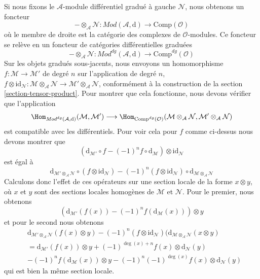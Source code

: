 \medskip\noindent
Si nous fixons le $\mathcal{A}$-module différentiel gradué à gauche $\mathcal{N}$, nous obtenons un foncteur
$$
- \otimes_\mathcal{A} \mathcal{N} :
\textit{Mod}(\mathcal{A}, \text{d})
\longrightarrow
\text{Comp}(\mathcal{O})
$$
où le membre de droite est la catégorie des complexes de $\mathcal{O}$-modules.
Ce foncteur se relève en un foncteur de catégories différentielles graduées
$$
- \otimes_\mathcal{A} \mathcal{N} :
\textit{Mod}^{dg}(\mathcal{A}, \text{d})
\longrightarrow
\text{Comp}^{dg}(\mathcal{O})
$$
Sur les objets gradués sous-jacents, nous envoyons un homomorphisme $f : \mathcal{M} \to \mathcal{M}'$ de degré $n$ sur l'application de degré $n$, $f \otimes \text{id}_\mathcal{N} : \mathcal{M} \otimes_\mathcal{A} \mathcal{N} \to \mathcal{M}' \otimes_\mathcal{A} \mathcal{N}$, conformément à la construction de la section \ref{section-tensor-product}.
Pour montrer que cela fonctionne, nous devons vérifier que l'application
$$
\Hom_{\textit{Mod}^{dg}(\mathcal{A}, \text{d})}(\mathcal{M}, \mathcal{M}')
\longrightarrow
\Hom_{\text{Comp}^{dg}(\mathcal{O})}(
\mathcal{M} \otimes_\mathcal{A} \mathcal{N},
\mathcal{M}' \otimes_\mathcal{A} \mathcal{N})
$$
est compatible avec les différentiels.
Pour voir cela pour $f$ comme ci-dessus nous devons montrer que
$$
(\text{d}_{\mathcal{M}'} \circ f - (-1)^n f \circ \text{d}_\mathcal{M})
\otimes \text{id}_\mathcal{N}
$$
est égal à
$$
\text{d}_{\mathcal{M}' \otimes_\mathcal{A} \mathcal{N}}
\circ (f \otimes \text{id}_\mathcal{N})
- (-1)^n (f \otimes \text{id}_\mathcal{N}) \circ
\text{d}_{\mathcal{M} \otimes_\mathcal{A} \mathcal{N}}
$$
Calculons donc l'effet de ces opérateurs sur une section locale de la forme $x \otimes y$, où $x$ et $y$ sont des sections locales homogènes de $\mathcal{M}$ et $\mathcal{N}$.
Pour le premier, nous obtenons
$$
(\text{d}_{\mathcal{M}'}(f(x)) - (-1)^n f(\text{d}_\mathcal{M}(x))) \otimes y
$$
et pour le second nous obtenons
\begin{align*}
&\text{d}_{\mathcal{M}' \otimes_\mathcal{A} \mathcal{N}}(f(x) \otimes y)
- (-1)^n (f \otimes \text{id}_\mathcal{N})(
\text{d}_{\mathcal{M} \otimes_\mathcal{A} \mathcal{N}}(x \otimes y) \\
& =
\text{d}_{\mathcal{M}'}(f(x)) \otimes y +
(-1)^{\deg(x) + n}f(x) \otimes \text{d}_\mathcal{N}(y) \\
&
-(-1)^n f(\text{d}_\mathcal{M}(x)) \otimes y
-(-1)^n (-1)^{\deg(x)}f(x) \otimes \text{d}_\mathcal{N}(y)
\end{align*}
qui est bien la même section locale.










